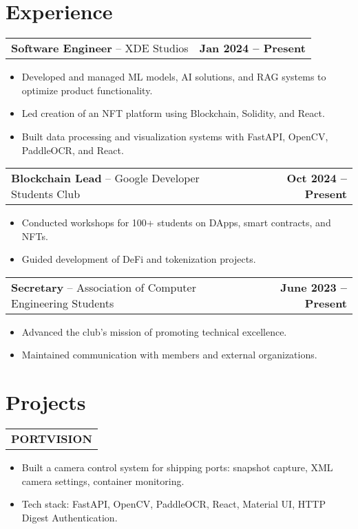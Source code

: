 \documentclass[a4paper,10pt]{article}
\begin{document}
\section{\textbf{Experience}}
\begin{tabularx}{\linewidth}{@{}X r@{}}
\textbf{Software Engineer} -- XDE Studios & \textbf{Jan 2024 -- Present} \\
\end{tabularx}
\begin{itemize}[nosep,leftmargin=*]
    \item Developed and managed ML models, AI solutions, and RAG systems to optimize product functionality.
    \item Led creation of an NFT platform using Blockchain, Solidity, and React.
    \item Built data processing and visualization systems with FastAPI, OpenCV, PaddleOCR, and React.
\end{itemize}

\begin{tabularx}{\linewidth}{@{}X r@{}}
\textbf{Blockchain Lead} -- Google Developer Students Club & \textbf{Oct 2024 -- Present} \\
\end{tabularx}
\begin{itemize}[nosep,leftmargin=*]
    \item Conducted workshops for 100+ students on DApps, smart contracts, and NFTs.
    \item Guided development of DeFi and tokenization projects.
\end{itemize}

\begin{tabularx}{\linewidth}{@{}X r@{}}
\textbf{Secretary} -- Association of Computer Engineering Students & \textbf{June 2023 -- Present} \\
\end{tabularx}
\begin{itemize}[nosep,leftmargin=*]
    \item Advanced the club's mission of promoting technical excellence.
    \item Maintained communication with members and external organizations.
\end{itemize}

\section{\textbf{Projects}}
\begin{tabularx}{\linewidth}{@{}X@{}}
\textbf{PORTVISION} \\
\end{tabularx}
\begin{itemize}[nosep,leftmargin=*]
    \item Built a camera control system for shipping ports: snapshot capture, XML camera settings, container monitoring.
    \item Tech stack: FastAPI, OpenCV, PaddleOCR, React, Material UI, HTTP Digest Authentication.
\end{itemize}
\end{document}
